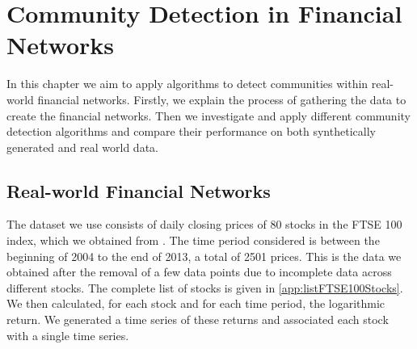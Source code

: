 
\chapter{Community Detection in Financial Networks}

\label{cha:communityDetectionFinancialNetworks}


In this chapter we aim to apply algorithms to detect communities within real-world financial networks.
Firstly, we explain the process of gathering the data to create the financial networks.
Then we investigate and apply different community detection algorithms and compare their performance on both synthetically generated and real world data.


\section{Real-world Financial Networks}
\label{sec:constructingRealWorldFinancialNetworks}

The dataset we use consists of daily closing prices of 80 stocks in the FTSE 100 index, which we obtained from \cite{YahFi}. The time period considered is between the beginning of 2004 to the end of 2013, a total of 2501 prices. This is the data we obtained after the removal of a few data points due to incomplete data across different stocks. The complete list of stocks is given in \cref{app:listFTSE100Stocks}. We then calculated, for each stock and for each time period, the logarithmic return. We generated a time series of these returns and associated each stock with a single time series.